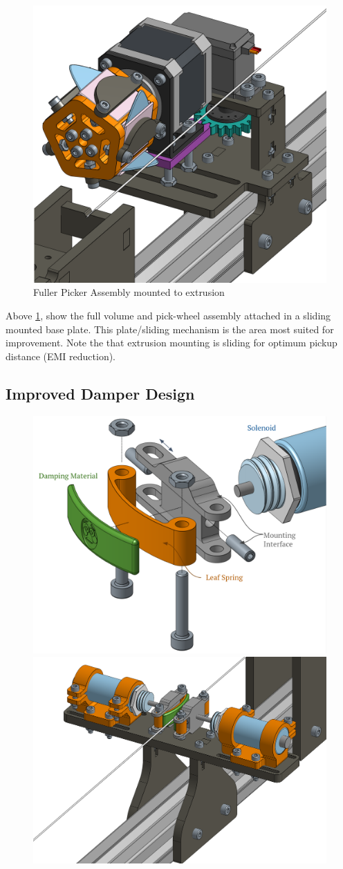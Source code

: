 \documentclass[a4paper,11pt]{article}
\begin{document}
\newpage
\begin{figure}[h!]
  \begin{center}
    \includegraphics[width=.4\textwidth]{images/picker_assembly.png}
    \caption{Fuller Picker Assembly mounted to extrusion}
    \label{picker}
  \end{center}
\end{figure}

Above \ref{picker}, show the full volume and pick-wheel assembly attached in a sliding mounted base plate. This plate/sliding mechanism is the area most suited for improvement.
Note the that extrusion mounting is sliding for optimum pickup distance (EMI reduction).

\subsection{Improved Damper Design}

\begin{figure}[h!]
  \begin{center}
    \includegraphics[width=.4\textwidth]{images/damper_explode.png}
    \includegraphics[width=.4\textwidth]{images/damper_assembly.png}
    \label{damp}
  \end{center}
\end{figure}
\end{document}
